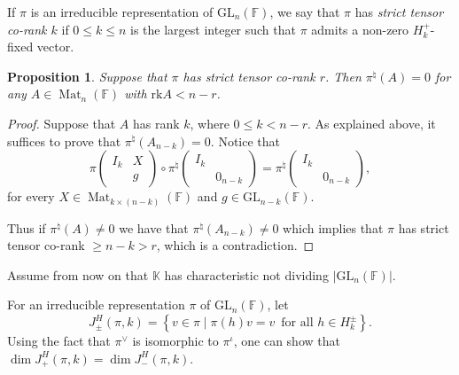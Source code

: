 \documentclass[12pt, reqno]{amsart}
\newtheorem{proposition}[theorem]{Proposition}
\theoremstyle{definition}
\newcommand{\coefficientsField}{\mathbb{K}}
\newcommand{\sizeof}[1]{\left|#1\right|}
\newcommand{\IdentityMatrix}[1]{I_{#1}}
\newcommand{\GL}{\mathrm{GL}}
\newcommand{\Mat}[2]{\operatorname{Mat}_{#1 \times #2}}
\newcommand{\finiteField}{\mathbb{F}}
\newcommand{\squareMatrix}{\operatorname{Mat}}
\newcommand{\rank}{\mathrm{rk}}
\newcommand{\pHJacquetModule}[2]{J^H_{+}\left(#1, #2\right)}
\newcommand{\pnHJacquetModule}[2]{J^H_{\pm}\left(#1, #2\right)}
\newcommand{\nHJacquetModule}[2]{J^H_{-}\left(#1, #2\right)}
\begin{document}
	
	If $\pi$ is an irreducible representation of $\GL_n\left(\finiteField\right)$, we say that $\pi$ has \emph{strict tensor co-rank $k$} if $0 \le k \le n$ is the largest integer such that $\pi$ admits a non-zero $H^+_k$-fixed vector. 
	
	\begin{proposition}\label{prop:strict-tensor-co-rank-and-vanishing}
		Suppose that $\pi$ has strict tensor co-rank $r$. Then $\pi^{\natural}\left(A\right) = 0$ for any $A \in \squareMatrix_n\left(\finiteField\right)$ with $\rank A < n-r$.
	\end{proposition}
	\begin{proof}
		Suppose that $A$ has rank $k$, where $0 \le k < n - r$. As explained above, it suffices to prove that $\pi^{\natural}\left(A_{n-k}\right) = 0$. Notice that
		\begin{displaymath}
			\pi\begin{pmatrix}
				\IdentityMatrix{k} & X\\
				& g
			\end{pmatrix} \circ \pi^{\natural}\begin{pmatrix}
			\IdentityMatrix{k}\\
			& 0_{n-k}
			\end{pmatrix} = \pi^{\natural}\begin{pmatrix}
			\IdentityMatrix{k}\\
			& 0_{n-k}
			\end{pmatrix},
		\end{displaymath}
		for every $X \in \Mat{k}{\left(n-k\right)}\left(\finiteField\right)$ and $g \in \GL_{n-k}\left(\finiteField\right)$. 
		
		Thus if $\pi^{\natural}\left(A\right) \ne 0$ we have that $\pi^{\natural}\left(A_{n-k}\right) \ne 0$ which implies that $\pi$ has strict tensor co-rank $\ge n-k>r$, which is a contradiction.	
	\end{proof}
	
	Assume from now on that $\coefficientsField$ has characteristic not dividing $\sizeof{\GL_n\left(\finiteField\right)}$.
	
	For an irreducible representation $\pi$ of $\GL_n\left(\finiteField\right)$, let
	\begin{displaymath}
	\pnHJacquetModule{\pi}{k} = \left\{v \in \pi \mid \pi\left(h\right) v = v \, \text{ for all } h \in H_k^{\pm} \right\}.
	\end{displaymath}
	Using the fact that $\pi^{\vee}$ is isomorphic to $\pi^{\iota}$, one can show that $\dim \pHJacquetModule{\pi}{k} = \dim \nHJacquetModule{\pi}{k}$.
	
\end{document}

